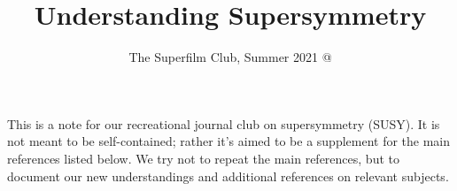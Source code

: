 \documentclass[a4paper
	,10pt
]{article}
\title{Understanding Supersymmetry}
\author{The Superfilm Club, Summer 2021 @ \textkai{近春园}}
\begin{document}
\maketitle
{}
\thispagestyle{empty}


This is a note for our recreational journal club on supersymmetry (SUSY). It is not meant to be self-contained; rather it's aimed to be a supplement for the main references listed below. We try not to repeat the main references, but to document our new understandings and additional references on relevant subjects. 

\setlength{\parskip}{.1\baselineskip}
\tableofcontents
\setlength{\parskip}{\parskipnorm}

\addtocounter{section}{-1}
\end{document}
